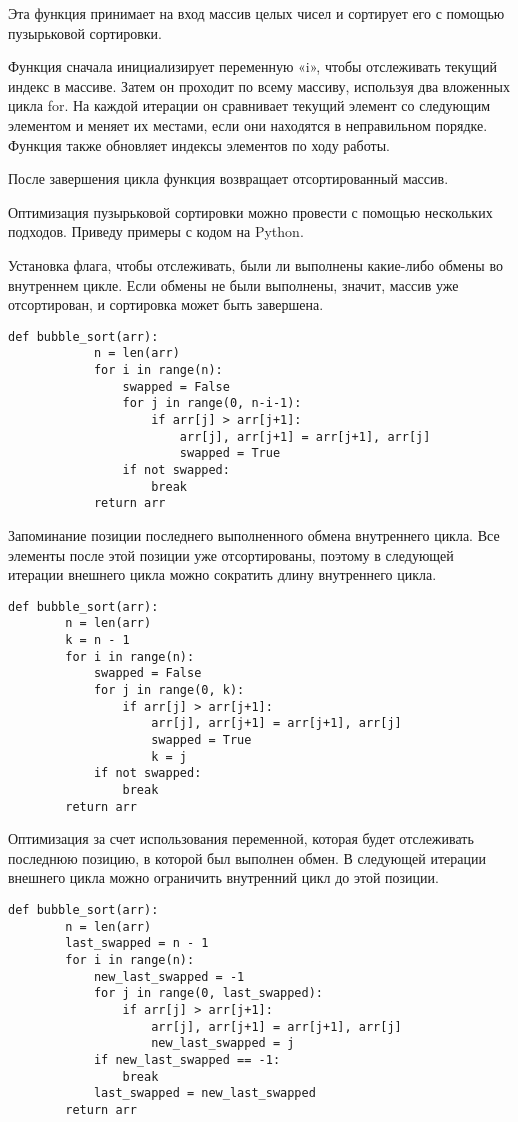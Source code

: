 \documentclass[oneside,14pt]{extarticle} %
\begin{document}
	Эта функция принимает на вход массив целых чисел и сортирует его с помощью пузырьковой сортировки.
		
	Функция сначала инициализирует переменную «i», чтобы отслеживать текущий индекс в массиве. Затем он проходит по всему массиву, используя два вложенных цикла for. На каждой итерации он сравнивает текущий элемент со следующим элементом и меняет их местами, если они находятся в неправильном порядке. Функция также обновляет индексы элементов по ходу работы.
		
	После завершения цикла функция возвращает отсортированный массив.
	
	Оптимизация пузырьковой сортировки можно провести с помощью нескольких подходов. Приведу примеры с кодом на Python.
	
	Установка флага, чтобы отслеживать, были ли выполнены какие-либо обмены во внутреннем цикле. Если обмены не были выполнены, значит, массив уже отсортирован, и сортировка может быть завершена.
	
	\begin{lstlisting}[caption={Вид оптимизации алгоритма пузырьковой сортировки}]
		def bubble_sort(arr):
			n = len(arr)
			for i in range(n):
				swapped = False
				for j in range(0, n-i-1):
					if arr[j] > arr[j+1]:
						arr[j], arr[j+1] = arr[j+1], arr[j]
						swapped = True
				if not swapped:
					break
			return arr
	\end{lstlisting}
	
	
	Запоминание позиции последнего выполненного обмена внутреннего цикла. Все элементы после этой позиции уже отсортированы, поэтому в следующей итерации внешнего цикла можно сократить длину внутреннего цикла.
	
	\begin{lstlisting}[caption={Вид оптимизации алгоритма пузырьковой сортировки}]
	def bubble_sort(arr):
		n = len(arr)
		k = n - 1
		for i in range(n):
			swapped = False
			for j in range(0, k):
				if arr[j] > arr[j+1]:
					arr[j], arr[j+1] = arr[j+1], arr[j]
					swapped = True
					k = j
			if not swapped:
				break
		return arr
	\end{lstlisting}
	
	Оптимизация за счет использования переменной, которая будет отслеживать последнюю позицию, в которой был выполнен обмен. В следующей итерации внешнего цикла можно ограничить внутренний цикл до этой позиции.
	
	\begin{lstlisting}[caption={Вид оптимизации алгоритма пузырьковой сортировки}]
	def bubble_sort(arr):
		n = len(arr)
		last_swapped = n - 1
		for i in range(n):
			new_last_swapped = -1
			for j in range(0, last_swapped):
				if arr[j] > arr[j+1]:
					arr[j], arr[j+1] = arr[j+1], arr[j]
					new_last_swapped = j
			if new_last_swapped == -1:
				break
			last_swapped = new_last_swapped
		return arr
	\end{lstlisting}
	
\end{document}
